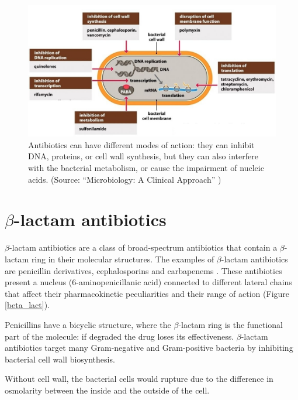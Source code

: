 \documentclass[11pt]{report}
\begin{document}
\clearpage
\begin{figure}[htp]
\centering
\includegraphics[scale=0.4500]{img/microbiology.jpg}
\caption{Antibiotics can have different modes of action: they can inhibit DNA, proteins, or cell wall synthesis, but they can also interfere with the bacterial metabolism, or cause the impairment of nucleic acids.
(Source: ``Microbiology: A Clinical Approach'' \cite{microbiology})}
\label{microbiology}
\end{figure}

\section{$\beta$-lactam antibiotics}
$\beta$-lactam antibiotics are a class of broad-spectrum antibiotics that contain a $\beta$-lactam ring in their molecular structures.
The examples of $\beta$-lactam antibiotics are penicillin derivatives, cephalosporins and carbapenems \cite{pitout2005}.
These antibiotics present a nucleus (6-aminopenicillanic acid) connected to different lateral chains that affect their pharmacokinetic peculiarities and their range of action (Figure \ref{beta_lact}).

Penicillins have a bicyclic structure, where the $\beta$-lactam ring is the functional part of the molecule: if degraded the drug loses its effectiveness.
$\beta$-lactam antibiotics target many Gram-negative and Gram-positive bacteria by inhibiting bacterial cell wall biosynthesis.

Without cell wall, the bacterial cells would rupture due to the difference in osmolarity between the inside and the outside of the cell.
\end{document}

